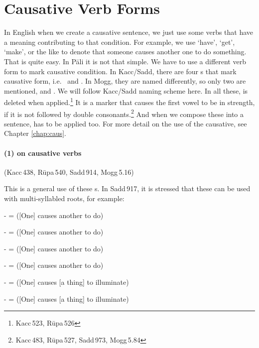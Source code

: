 {}
\section*{Causative Verb Forms}\label{pacca:dne2}\label{pacca:dnaya3}\label{pacca:dnaape}\label{pacca:dnaapaya}\label{pacca:dni2}\label{pacca:dnaapi}

In English when we create a causative sentence, we just use some verbs that have a meaning contributing to that condition. For example, we use `have', `get', `make', or the like to denote that someone causes another one to do something. That is quite easy. In P\=ali it is not that simple. We have to use a different verb form to mark causative condition. In Kacc/Sadd, there are four s that mark causative form, i.e.\  and . In Mogg, they are named differently, so only two are mentioned,  and . We will follow Kacc/Sadd naming scheme here. In all these,  is deleted when applied.\footnote{Kacc\,523, R\=upa\,526} It is a  marker that causes the first vowel to be in  strength, if it is not followed by double consonants.\footnote{Kacc\,483, R\=upa\,527, Sadd\,973, Mogg\,5.84} And when we compose these into a sentence,  has to be applied too. For more detail on the use of the causative, see Chapter \ref{chap:caus}.

\paragraph*{(1)  on causative verbs} (Kacc\,438, R\=upa\,540, Sadd\,914, Mogg\,5.16)\par
This is a general use of these s. In Sadd\,917, it is stressed that these can be used with multi-syllabled roots, for example:\par
-  =  ([One] causes another to do)\par
-  =  ([One] causes another to do)\par
-  =  ([One] causes another to do)\par
-  =  ([One] causes another to do)\par
-  =  ([One] causes [a thing] to illuminate)\par
-  =  ([One] causes [a thing] to illuminate)\par

